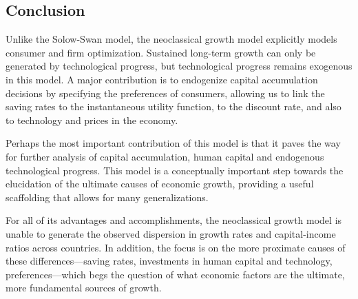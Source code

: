 \documentclass[\topdir/lecture\_notes.tex]{subfiles}
\begin{document}
\subsection{Conclusion}
Unlike the Solow-Swan model, the neoclassical growth model explicitly models consumer and firm optimization.
Sustained long-term growth can only be generated by technological progress, but technological progress remains exogenous in this model.
A major contribution is to endogenize capital accumulation decisions by specifying the preferences of consumers, allowing us to link the saving rates to the instantaneous utility function, to the discount rate, and also to technology and prices in the economy.

Perhaps the most important contribution of this model is that it paves the way for further analysis of capital accumulation, human capital and endogenous technological progress.
This model is a conceptually important step towards the elucidation of the ultimate causes of economic growth, providing a useful scaffolding that allows for many generalizations.

For all of its advantages and accomplishments, the neoclassical growth model is unable to generate the observed dispersion in growth rates and capital-income ratios across countries.
In addition, the focus is on the more proximate causes of these differences---saving rates, investments in human capital and technology, preferences---which begs the question of what economic factors are the ultimate, more fundamental sources of growth.
\end{document}
